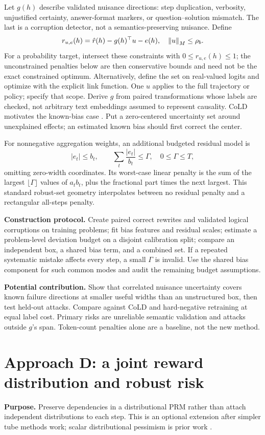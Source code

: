 Let $g(h)$ describe validated nuisance directions: step duplication, verbosity,
unjustified certainty, answer-format markers, or question--solution mismatch.
The last is a corruption detector, not a semantics-preserving nuisance. Define
\[
 r_{u,e}(h)=\hat r(h)-g(h)^\top u-e(h),\quad
 \left\lVert u\right\rVert_M\le\rho_b.
\]
For a probability target, intersect these constraints with $0\le r_{u,e}(h)\le1$;
the unconstrained penalties below are then conservative bounds and need not be
the exact constrained optimum. Alternatively, define the set on real-valued
logits and optimize with the explicit link function.
One $u$ applies to the full trajectory or policy; specify that scope. Derive
$g$ from paired transformations whose labels are checked, not arbitrary text
embeddings assumed to represent causality. CoLD motivates the known-bias case
\cite{cold}. Put a zero-centered uncertainty set around unexplained effects;
an estimated known bias should first correct the center.

For nonnegative aggregation weights, an additional budgeted residual model is
\[
 |e_t|\le b_t,\qquad\sum_t\frac{|e_t|}{b_t}\le\Gamma,
 \quad 0\le\Gamma\le T,
\]
omitting zero-width coordinates. Its worst-case linear penalty is the sum of the
largest $\lfloor\Gamma\rfloor$ values of $a_tb_t$, plus the fractional part
times the next largest. This standard robust-set geometry interpolates between
no residual penalty and a rectangular all-steps penalty.

\textbf{Construction protocol.} Create paired correct rewrites and validated
logical corruptions on training problems; fit bias features and residual scales;
estimate a problem-level deviation budget on a disjoint calibration split;
compare an independent box, a shared bias term, and a combined set. If a repeated
systematic mistake affects every step, a small $\Gamma$ is invalid. Use the shared
bias component for such common modes and audit the remaining budget assumptions.

\textbf{Potential contribution.} Show that correlated nuisance uncertainty covers
known failure directions at smaller useful widths than an unstructured box,
then test held-out attacks. Compare against CoLD and hard-negative retraining at
equal label cost. Primary risks are unreliable semantic validation and attacks
outside $g$'s span. Token-count penalties alone are a baseline, not the new method.

\section{Approach D: a joint reward distribution and robust risk}
\textbf{Purpose.} Preserve dependencies in a distributional PRM rather than
attach independent distributions to each step. This is an optional extension
after simpler tube methods work; scalar distributional pessimism is prior work
\cite{unifying,otprm,prism}.

